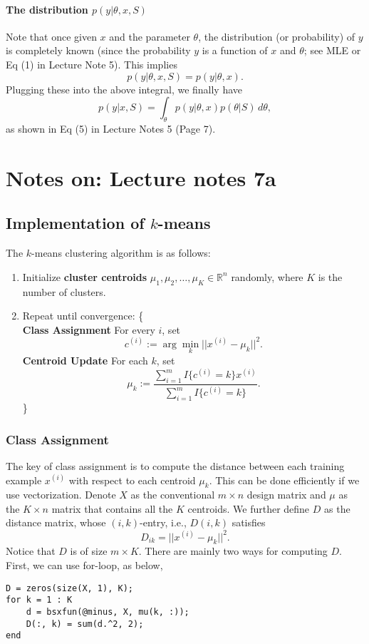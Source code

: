 \documentclass{article}
\begin{document}
\paragraph{The distribution $p(y|\theta,x,S)$} Note that once given $x$ and the parameter $\theta$, the distribution (or probability) of $y$ is completely known (since the probability $y$ is a function of $x$ and $\theta$; see MLE or Eq (1) in Lecture Note 5). This implies
\[
p(y|\theta,x,S)=p(y|\theta,x).
\]
Plugging these into the above integral, we finally have
\[
p(y|x,S)=\int_{\theta} p(y|\theta,x)p(\theta|S)\, d\theta,
\]
as shown in Eq (5) in Lecture Notes 5 (Page 7).

\section{Notes on: Lecture notes 7a}
\subsection{Implementation of $k$-means}
The $k$-means clustering algorithm is as follows:
\begin{enumerate}
   \item Initialize \textbf{cluster centroids} $\mu_1,\mu_2,\ldots,\mu_K\in\mathbb{R}^n$ randomly, where $K$ is the number of clusters.
   \item Repeat until convergence: \{\\

         \quad \textbf{Class Assignment} For every $i$, set
         \[
         c^{(i)}:=\arg\underset{k}{\min}||x^{(i)}-\mu_{k}||^2.
         \]
         \quad \textbf{Centroid Update} For each $k$, set
         \[
         \mu_k:=\frac{\sum_{i=1}^{m}I\{c^{(i)}=k\}x^{(i)}}{\sum_{i=1}^{m}I\{c^{(i)}=k\}}.
         \]
         \quad\}
\end{enumerate}
\subsubsection{Class Assignment}
The key of class assignment is to compute the distance between each training example $x^{(i)}$ with respect to each centroid $\mu_{k}$. This can be done efficiently if we use vectorization. Denote $X$ as the conventional $m\times n$ design matrix and $\mu$ as the $K\times n$ matrix that contains all the $K$ centroids. We further define $D$ as the distance matrix, whose $(i,k)$-entry, i.e., $D(i,k)$ satisfies
\[
D_{ik}=||x^{(i)}-\mu_{k}||^2.
\]
Notice that $D$ is of size $m\times K$. There are mainly two ways for computing $D$. First, we can use for-loop, as below,
\begin{verbatim}
D = zeros(size(X, 1), K);
for k = 1 : K
    d = bsxfun(@minus, X, mu(k, :));
    D(:, k) = sum(d.^2, 2);
end
\end{verbatim}
\end{document}
